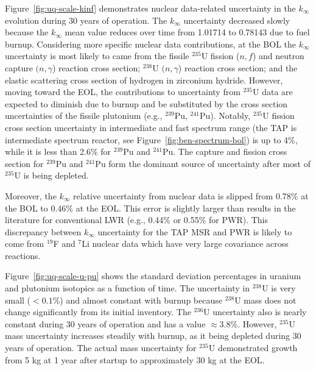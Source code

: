 Figure~\ref{fig:uq-scale-kinf} demonstrates nuclear data-related uncertainty 
in the $k_{\infty}$ evolution during 30 years of operation. The $k_{\infty}$  
uncertainty decreased slowly because the $k_{\infty}$ mean value reduces over 
time from 1.01714 to 0.78143 due to fuel burnup. Considering more specific 
nuclear data contributions, at the \gls{BOL} the $k_{\infty}$ uncertainty is 
most likely to came from the fissile $^{235}$U fission ($n,f$) and neutron 
capture $(n,\gamma$) reaction cross section; $^{238}$U $(n,\gamma$) reaction 
cross section; and the elastic scattering cross section of hydrogen in 
zirconium hydride. However, moving toward the \gls{EOL}, the contributions to 
uncertainty from $^{235}$U data are expected to diminish due to burnup and be 
substituted by the cross section uncertainties of the fissile plutonium (e.g., 
$^{239}$Pu, $^{241}$Pu). Notably, $^{235}$U fission cross section uncertainty 
in intermediate and fast spectrum range (the \gls{TAP} is intermediate 
spectrum reactor, see Figure~\ref{fig:ben-spectrum-bol}) is up to 4\%, while 
it is less than 2.6\% for $^{239}$Pu and $^{241}$Pu. The capture and fission 
cross section for $^{239}$Pu and $^{241}$Pu form the dominant source of 
uncertainty after most of $^{235}$U is being depleted. %

Moreover, the $k_{\infty}$ relative uncertainty from
nuclear data is slipped 
from 0.78\% at the \gls{BOL} to 0.46\% at the \gls{EOL}. This error is 
slightly larger than results in the literature for conventional \gls{LWR} 
(e.g., 0.44\% \cite{williams_statistical_2013} or 0.55\% 
\cite{campolina_uncertainty_2018} for \gls{PWR}). This discrepancy between 
$k_{\infty}$ uncertainty for the \gls{TAP} \gls{MSR} and \gls{PWR} is likely 
to come from $^{19}$F and $^{7}$Li nuclear data which have very large 
covariance across reactions.

Figure~\ref{fig:uq-scale-u-pu} shows the standard deviation percentages in 
uranium and plutonium isotopics as a function of time. The uncertainty in 
$^{238}$U is very small ($<0.1$\%) and almost constant with burnup because 
$^{238}$U mass does not change significantly from its initial inventory. The 
$^{236}$U uncertainty also is nearly constant during 30 years of operation and 
has a value $\approx3.8$\%. However, $^{235}$U mass uncertainty increases 
steadily with burnup, as it being depleted during 30 years of operation. 
The actual mass uncertainty for $^{235}$U demonstrated growth from 5 kg at 1 
year after startup to approximately 30 kg at the \gls{EOL}.

